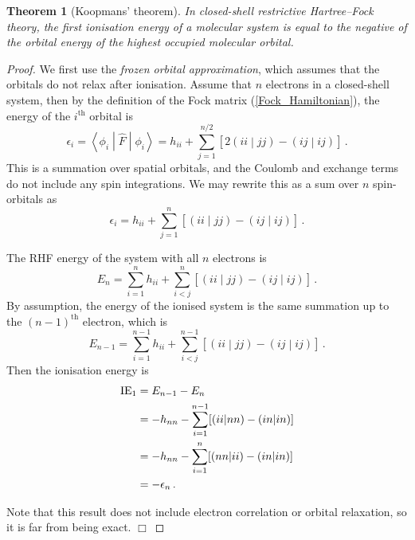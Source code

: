 \documentclass{article}
\theoremstyle{plain}\theoremheaderfont{\normalfont\itshape}\theorembodyfont{\rmfamily}\theoremseparator{.}\newtheorem*{rem}{Remark}\newtheorem*{ex}{Example}\newtheorem*{proof}{Proof}\newtheorem*{altp}{Alternative proof}
\theoremstyle{plain}\theoremheaderfont{\normalfont\bfseries}\theorembodyfont{\rmfamily}\theoremseparator{.}\newtheorem{thm}{Theorem}[section]\newtheorem{lem}[thm]{Lemma}\newtheorem{prop}[thm]{Proposition}\newtheorem*{cor}{Corollary}\newtheorem{defn}[thm]{Definition}\newtheorem{clm}[thm]{Claim}\newtheorem{clminproof}{Claim}
\theoremstyle{break}\theoremheaderfont{\normalfont\itshape}\theorembodyfont{\rmfamily}\theoremseparator{.\medskip}\newtheorem*{proofskip}{Proof}\newtheorem*{exs}{Examples}\newtheorem*{rems}{Remarks}
\theoremstyle{break}\theoremheaderfont{\normalfont\bfseries}\theorembodyfont{\rmfamily}\theoremseparator{.\medskip}\newtheorem{lemskip}[thm]{Lemma}\newtheorem{defnskip}[thm]{Definition}\newtheorem{propskip}[thm]{Proposition}\newtheorem{thmskip}[thm]{Theorem}
\numberwithin{equation}{section}
\newcommand{\qed}{\hfill\ensuremath{\Box}}
\newcommand{\expval}[2]{\left\langle #2 \middle| #1 \middle| #2 \right\rangle}
\newcommand{\bracket}[2]{\left( #1 \middle| #2 \right)}
\begin{document}
    \begin{thm}[Koopmans' theorem]
        In closed-shell restrictive Hartree--Fock theory, the first ionisation energy of a molecular system is equal to the negative of the orbital energy of the highest occupied molecular orbital.
    \end{thm}
    \begin{proof}
        We first use the \textit{frozen orbital approximation}, which assumes that the orbitals do not relax after ionisation. Assume that \(n\) electrons in a closed-shell system, then by the definition of the Fock matrix (\ref{Fock_Hamiltonian}), the energy of the \(i^{\text{th}}\) orbital is
        \begin{equation}
            \epsilon_i=\expval{\hat{F}}{\phi_i}=h_{ii}+\sum_{j=1}^{n/2}[2\bracket{ii}{jj}-\bracket{ij}{ij}]\,.
        \end{equation}
        This is a summation over spatial orbitals, and the Coulomb and exchange terms do not include any spin integrations. We may rewrite this as a sum over \(n\) spin-orbitals as
        \begin{equation}
            \epsilon_i=h_{ii}+\sum_{j=1}^{n}[\bracket{ii}{jj}-\bracket{ij}{ij}]\,.
        \end{equation}

        The RHF energy of the system with all \(n\) electrons is
        \begin{equation}
            E_n=\sum_{i=1}^{n}h_{ii}+\sum_{i<j}^{n}[\bracket{ii}{jj}-\bracket{ij}{ij}]\,.
        \end{equation}
        By assumption, the energy of the ionised system is the same summation up to the \((n-1)^{\text{th}}\) electron, which is
        \begin{equation}
            E_{n-1}=\sum_{i=1}^{n-1}h_{ii}+\sum_{i<j}^{n-1}[\bracket{ii}{jj}-\bracket{ij}{ij}]\,.
        \end{equation}
        Then the ionisation energy is
        \begin{align}
            \mathrm{IE}_1&=E_{n-1}-E_{n}\notag\\
            &=-h_{nn}-\sum_{i=1}^{n-1}[\bracket{ii}{nn}-\bracket{in}{in}]\notag\\
            &=-h_{nn}-\sum_{i=1}^{n}[\bracket{nn}{ii}-\bracket{in}{in}]\notag\\
            &=-\epsilon_n\,.
        \end{align}

        Note that this result does not include electron correlation or orbital relaxation, so it is far from being exact. \qed
    \end{proof}
\end{document}
